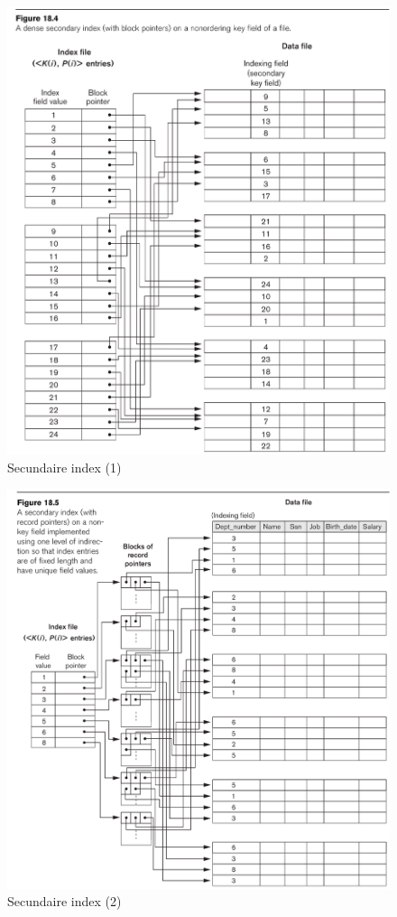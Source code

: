 \documentclass[indexstructuren.tex]{subfiles}
\begin{document}
\begin{figure}[H]
\includegraphics[width=\linewidth]{illustraties/secondaire_index.png}
\caption{Secundaire index (1)}
\end{figure}
\begin{figure}[H]
\includegraphics[width=\linewidth]{illustraties/secondaire_index2.png}
\caption{Secundaire index (2)}
\end{figure}
\end{document}

